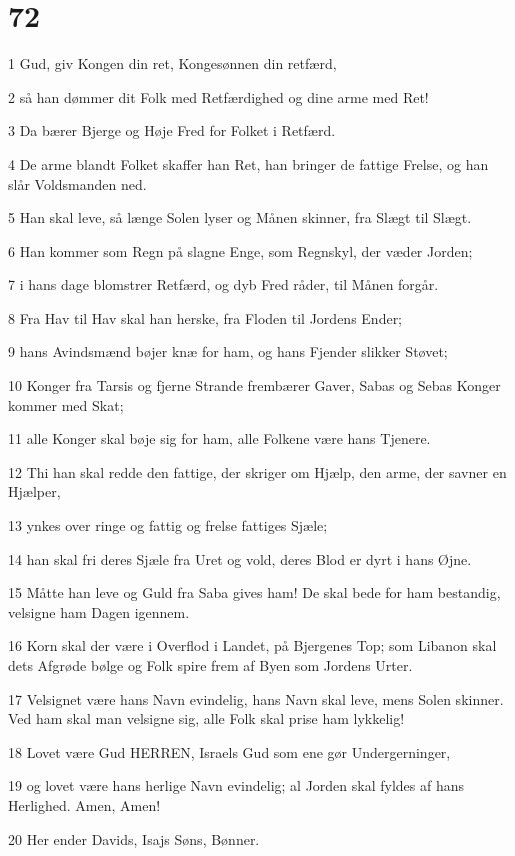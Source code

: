 \chapter{72}

\par 1 Gud, giv Kongen din ret, Kongesønnen din retfærd,
\par 2 så han dømmer dit Folk med Retfærdighed og dine arme med Ret!
\par 3 Da bærer Bjerge og Høje Fred for Folket i Retfærd.
\par 4 De arme blandt Folket skaffer han Ret, han bringer de fattige Frelse, og han slår Voldsmanden ned.
\par 5 Han skal leve, så længe Solen lyser og Månen skinner, fra Slægt til Slægt.
\par 6 Han kommer som Regn på slagne Enge, som Regnskyl, der væder Jorden;
\par 7 i hans dage blomstrer Retfærd, og dyb Fred råder, til Månen forgår.
\par 8 Fra Hav til Hav skal han herske, fra Floden til Jordens Ender;
\par 9 hans Avindsmænd bøjer knæ for ham, og hans Fjender slikker Støvet;
\par 10 Konger fra Tarsis og fjerne Strande frembærer Gaver, Sabas og Sebas Konger kommer med Skat;
\par 11 alle Konger skal bøje sig for ham, alle Folkene være hans Tjenere.
\par 12 Thi han skal redde den fattige, der skriger om Hjælp, den arme, der savner en Hjælper,
\par 13 ynkes over ringe og fattig og frelse fattiges Sjæle;
\par 14 han skal fri deres Sjæle fra Uret og vold, deres Blod er dyrt i hans Øjne.
\par 15 Måtte han leve og Guld fra Saba gives ham! De skal bede for ham bestandig, velsigne ham Dagen igennem.
\par 16 Korn skal der være i Overflod i Landet, på Bjergenes Top; som Libanon skal dets Afgrøde bølge og Folk spire frem af Byen som Jordens Urter.
\par 17 Velsignet være hans Navn evindelig, hans Navn skal leve, mens Solen skinner. Ved ham skal man velsigne sig, alle Folk skal prise ham lykkelig!
\par 18 Lovet være Gud HERREN, Israels Gud som ene gør Undergerninger,
\par 19 og lovet være hans herlige Navn evindelig; al Jorden skal fyldes af hans Herlighed. Amen, Amen!
\par 20 Her ender Davids, Isajs Søns, Bønner.

